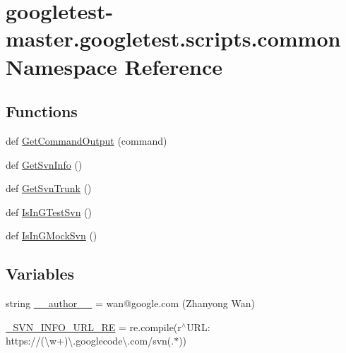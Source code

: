\hypertarget{namespacegoogletest-master_1_1googletest_1_1scripts_1_1common}{}\section{googletest-\/master.googletest.\+scripts.\+common Namespace Reference}
\label{namespacegoogletest-master_1_1googletest_1_1scripts_1_1common}
\subsection*{Functions}
\begin{DoxyCompactItemize}
\item 
def \mbox{\hyperlink{namespacegoogletest-master_1_1googletest_1_1scripts_1_1common_abc2f36cbd8e31faeb41df1fd97b97329}{Get\+Command\+Output}} (command)
\item 
def \mbox{\hyperlink{namespacegoogletest-master_1_1googletest_1_1scripts_1_1common_a0c60472d48d9631946afb3eeff31143c}{Get\+Svn\+Info}} ()
\item 
def \mbox{\hyperlink{namespacegoogletest-master_1_1googletest_1_1scripts_1_1common_aa7aa99301116457c7b68b3a9e647872e}{Get\+Svn\+Trunk}} ()
\item 
def \mbox{\hyperlink{namespacegoogletest-master_1_1googletest_1_1scripts_1_1common_ae09cf11a8f3c9d3a75a2774ce351ef6f}{Is\+In\+G\+Test\+Svn}} ()
\item 
def \mbox{\hyperlink{namespacegoogletest-master_1_1googletest_1_1scripts_1_1common_acc94b6b10194aacdf1442a347210a119}{Is\+In\+G\+Mock\+Svn}} ()
\end{DoxyCompactItemize}
\subsection*{Variables}
\begin{DoxyCompactItemize}
\item 
string \mbox{\hyperlink{namespacegoogletest-master_1_1googletest_1_1scripts_1_1common_a31d400546148f5b25d7893623b997f6b}{\+\_\+\+\_\+author\+\_\+\+\_\+}} = \textquotesingle{}wan@google.\+com (Zhanyong Wan)\textquotesingle{}
\item 
\mbox{\hyperlink{namespacegoogletest-master_1_1googletest_1_1scripts_1_1common_a2124f308e864e3a802b6dc35b592b2ed}{\+\_\+\+S\+V\+N\+\_\+\+I\+N\+F\+O\+\_\+\+U\+R\+L\+\_\+\+RE}} = re.\+compile(r\textquotesingle{}$^\wedge$U\+R\+L\+: https\+://(\textbackslash{}w+)\textbackslash{}.googlecode\textbackslash{}.\+com/svn(.$\ast$)\textquotesingle{})
\end{DoxyCompactItemize}


